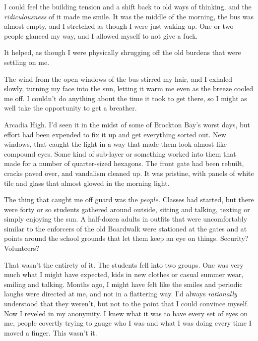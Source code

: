 I could feel the building tension and a shift back to old ways of thinking, and the \emph{ridiculousness} of it made me smile.  It was the middle of the morning, the bus was almost empty, and I stretched as though I were just waking up.  One or two people glanced my way, and I allowed myself to not give a fuck.



It helped, as though I were physically shrugging off the old burdens that were settling on me.



The wind from the open windows of the bus stirred my hair, and I exhaled slowly, turning my face into the sun, letting it warm me even as the breeze cooled me off.  I couldn't do anything about the time it took to get there, so I might as well take the opportunity to get a breather.



Arcadia High.  I'd seen it in the midst of some of Brockton Bay's worst days, but effort had been expended to fix it up and get everything sorted out.  New windows, that caught the light in a way that made them look almost like compound eyes.  Some kind of sub-layer or something worked into them that made for a number of quarter-sized hexagons.  The front gate had been rebuilt, cracks paved over, and vandalism cleaned up.  It was pristine, with panels of white tile and glass that almost glowed in the morning light.



The thing that caught me off guard was the \emph{people.  }Classes had started, but there were forty or so students gathered around outside, sitting and talking, texting or simply enjoying the sun.  A half-dozen adults in outfits that were uncomfortably similar to the enforcers of the old Boardwalk were stationed at the gates and at points around the school grounds that let them keep an eye on things.  Security?  Volunteers?



That wasn't the entirety of it.  The students fell into two groups.  One was very much what I might have expected, kids in new clothes or casual summer wear, smiling and talking.  Months ago, I might have felt like the smiles and periodic laughs were directed at me, and not in a flattering way.  I'd always\emph{ rationally} understood that they weren't, but not to the point that I could convince myself.  Now I reveled in my anonymity.  I knew what it was to have every set of eyes on me, people covertly trying to gauge who I was and what I was doing every time I moved a finger.  This wasn't it.



